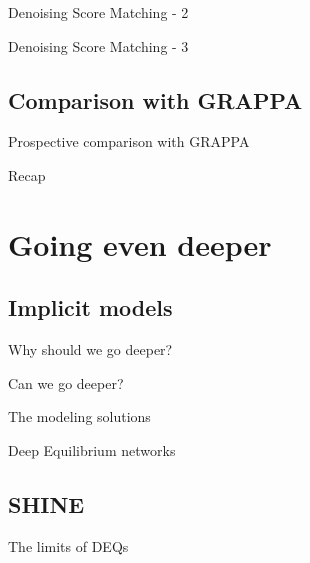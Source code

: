\documentclass[aspectratio=169,xcolor=dvipsnames]{beamer}
\begin{document}
\begin{frame}{Denoising Score Matching - 2}
\end{frame}

\begin{frame}{Denoising Score Matching - 3}
\end{frame}

\subsection{Comparison with GRAPPA}
\begin{frame}{Prospective comparison with GRAPPA}
\end{frame}

\begin{frame}{Recap}
\end{frame}

\section{Going even deeper}
\subsection{Implicit models}

\begin{frame}{Why should we go deeper?}
\end{frame}

\begin{frame}{Can we go deeper?}
\end{frame}

\begin{frame}{The modeling solutions}
\end{frame}

\begin{frame}{Deep Equilibrium networks}
\end{frame}

\subsection{SHINE}
\begin{frame}{The limits of DEQs}
\end{frame}
\end{document}
